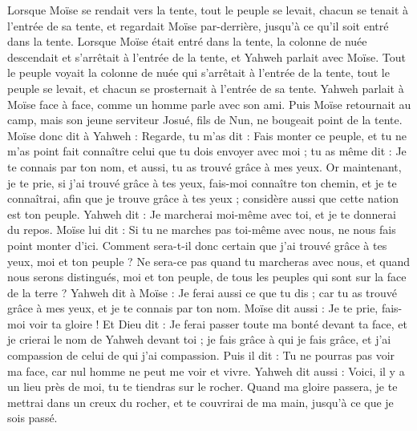 \begin{multicols}{2}
Lorsque Moïse se rendait vers la tente, tout le peuple se levait, chacun se tenait à l'entrée de sa tente, et regardait Moïse par-derrière, jusqu’à ce qu'il soit entré dans la tente.
Lorsque Moïse était entré dans la tente, la colonne de nuée descendait et s'arrêtait à l’entrée de la tente, et Yahweh parlait avec Moïse.
Tout le peuple voyait la colonne de nuée qui s’arrêtait à l’entrée de la tente, tout le peuple se levait, et chacun se prosternait à l’entrée de sa tente.
Yahweh parlait à Moïse face à face, comme un homme parle avec son ami. Puis Moïse retournait au camp, mais son jeune serviteur Josué, fils de Nun, ne bougeait point de la tente.
Moïse donc dit à Yahweh : Regarde, tu m'as dit : Fais monter ce peuple, et tu ne m'as point fait connaître celui que tu dois envoyer avec moi ; tu as même dit : Je te connais par ton nom, et aussi, tu as trouvé grâce à mes yeux.
Or maintenant, je te prie, si j'ai trouvé grâce à tes yeux, fais-moi connaître ton chemin, et je te connaîtrai, afin que je trouve grâce à tes yeux ; considère aussi que cette nation est ton peuple.
Yahweh dit : Je marcherai moi-même avec toi, et je te donnerai du repos.
Moïse lui dit : Si tu ne marches pas toi-même avec nous, ne nous fais point monter d'ici.
Comment sera-t-il donc certain que j’ai trouvé grâce à tes yeux, moi et ton peuple ? Ne sera-ce pas quand tu marcheras avec nous, et quand nous serons distingués, moi et ton peuple, de tous les peuples qui sont sur la face de la terre ?
Yahweh dit à Moïse : Je ferai aussi ce que tu dis ; car tu as trouvé grâce à mes yeux, et je te connais par ton nom.
Moïse dit aussi : Je te prie, fais-moi voir ta gloire !
Et Dieu dit : Je ferai passer toute ma bonté devant ta face, et je crierai le nom de Yahweh devant toi ; je fais grâce à qui je fais grâce, et j'ai compassion de celui de qui j'ai compassion.
Puis il dit : Tu ne pourras pas voir ma face, car nul homme ne peut me voir et vivre.
Yahweh dit aussi : Voici, il y a un lieu près de moi, tu te tiendras sur le rocher.
Quand ma gloire passera, je te mettrai dans un creux du rocher, et te couvrirai de ma main, jusqu’à ce que je sois passé.

\end{multicols}

